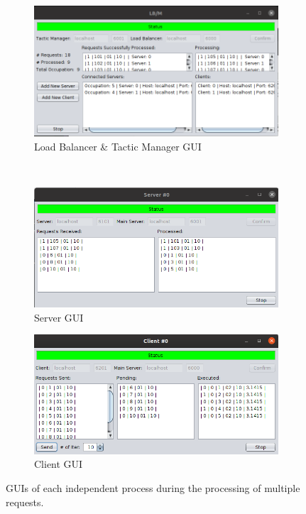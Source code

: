 \documentclass[12pt]{article}
\begin{document}
\clearpage
\begin{figure}[H]
  \centering
  \begin{subfigure}{.55\textwidth}
    \centering
    \includegraphics[width=.95\linewidth]{img/LBM_active.png}
    \caption{Load Balancer \& Tactic Manager GUI}
    \label{fig:LBM_active}
  \end{subfigure} \\
  \begin{subfigure}{.5\textwidth}
    \centering
    \includegraphics[width=.95\linewidth]{img/S_active.png}
    \caption{Server GUI}
    \label{fig:S_active}
  \end{subfigure}%
  \begin{subfigure}{.5\textwidth}
    \centering
    \includegraphics[width=.95\linewidth]{img/C_active.png}
    \caption{Client GUI}
    \label{fig:C_active}
  \end{subfigure}
  \caption{GUIs of each independent process during the processing of multiple requests.}
  \label{fig:GUIs_active}
\end{figure}
\end{document}
